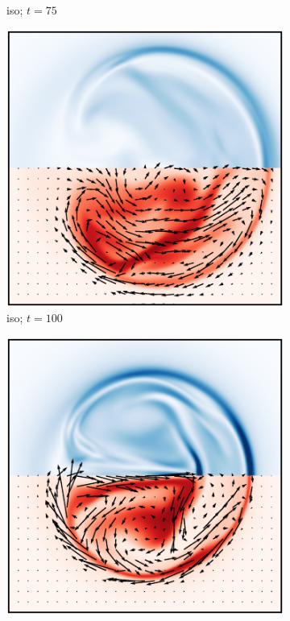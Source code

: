 \begin{figure}[t]
\begin{subfigure}[t]{0.32\textwidth}
    \caption{iso; $t=75$}
    \label{fig:final_isotropic_current_density_0015}
  \end{subfigure}
  \hfill
  \begin{subfigure}[t]{0.32\textwidth}
    \centering
    \includegraphics[width=\linewidth]{slices/final_isotropic_current_density_0020.pdf}
    \caption{iso; $t=100$}
    \label{fig:final_isotropic_current_density_0020}
  \end{subfigure}
  \hfill
  \begin{subfigure}[t]{0.32\textwidth}
    \centering
    \includegraphics[width=\linewidth]{slices/final_switching_current_density_0013.pdf}

\end{subfigure}
\end{figure}
